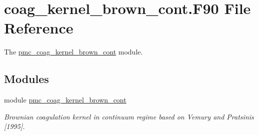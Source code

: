 \hypertarget{coag__kernel__brown__cont_8_f90}{}\section{coag\+\_\+kernel\+\_\+brown\+\_\+cont.\+F90 File Reference}
\label{coag__kernel__brown__cont_8_f90}


The \mbox{\hyperlink{namespacepmc__coag__kernel__brown__cont}{pmc\+\_\+coag\+\_\+kernel\+\_\+brown\+\_\+cont}} module.  


\subsection*{Modules}
\begin{DoxyCompactItemize}
\item 
module \mbox{\hyperlink{namespacepmc__coag__kernel__brown__cont}{pmc\+\_\+coag\+\_\+kernel\+\_\+brown\+\_\+cont}}
\begin{DoxyCompactList}\small\item\em Brownian coagulation kernel in continuum regime based on Vemury and Pratsinis \mbox{[}1995\mbox{]}. \end{DoxyCompactList}\end{DoxyCompactItemize}
